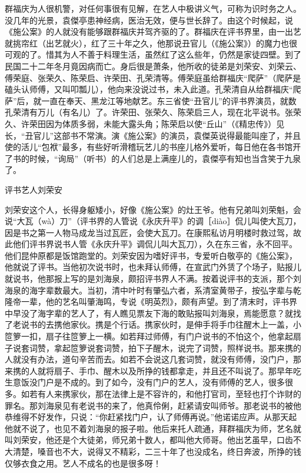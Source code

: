 \documentclass[12pt,UTF8]{ctexbook}
\begin{document}
群福庆为人很机警，对任何事很有见解，在艺人中极讲义气，可称为识时务之人。没几年的光景，袁傑亭患神经病，医治无效，便与世长辞了。由这个时候起，说《施公案》的人就没有能够跟群福庆并驾齐驱的了。群福庆在评书界里，由一出艺就挑帘红（出艺就火），红了三十年之久，他那说丑官儿（《施公案》）的魔力也很可观的了。惜其为人不善于料理生活，虽然红了这么些年，仍然是家徒四壁。到了民国二十二年冬月竟因病而亡。身后很是萧条，他所收的徒弟是刘荣安、刘荣云、傅荣庭、张荣久、陈荣启、许荣田、孔荣清等。傅荣庭虽给群福庆“爬萨”（爬萨是磕头认师傅，又叫叩瓢儿），他向来没说过书，未入此道。孔荣清自从给群福庆“爬萨”后，就一直在奉天、黑龙江等地献艺。东三省使“丑官儿”的评书界演员，就数孔荣清有万儿（有名儿）了。许荣田、张荣久、陈荣启三人，现在北平说书。张荣久、许荣田因为体质多弱，未能大露头角；陈荣启以使“丘山”（《精忠传》）见长，“丑官儿”这部书不常演。演《施公案》的演员，袁傑英说得最能叫座了，并且使的活儿“包袱”最多，有些好听滑稽玩艺儿的书座儿格外爱听，每日他在各书馆开了书的时候，“询局”（听书）的人们总是上满座儿的，袁傑亭有知也当含笑于九泉了。





评书艺人刘荣安


刘荣安这个人，长得身躯矮小，好像《施公案》的灶王爷。他有兄弟叫刘荣魁，会说“大瓦（wà）刀”（评书界的人管说《永庆升平》的调［diào］侃儿叫使大瓦刀，因是书之第一人物马成龙当过瓦匠，会使大瓦刀。在康熙私访月明楼时救过驾，故此他们评书界说书人管《永庆升平》调侃儿叫大瓦刀），久在东三省，永不回平。他们昆仲原都是饭馆跑堂的。刘荣安因为嗜好评书，专爱听白敬亭的《施公案》，他就说了评书。当他初次说书时，也未拜认师傅，在宣武门外赁了个场子，贴报儿就说书，他那报上写的是刘海泉，颇招评书界人不满。按着说评书的支派，那个刘海泉的海字辈数最大。当初，清中叶时有肇弘六者，系清室黄带子，按弘字辈与乾隆帝一辈，他的艺名叫肇海鸣，专说《明英烈》，颇有声望。到了清末时，评书界中早没了海字辈的艺人了，有人瞧见票友下海的敢贴报叫刘海泉，焉能愿意？就找了老说书的去携他家伙。携是个行话。携家伙时，是伸手将手巾往醒木上一盖，小笸箩一扣，扇子往笸箩上一横。如若拜过师傅，有门户说书的不怕这个，他拿起扇子说套词赞，拿起笸箩说套词赞，拍下子醒木，说完了词赞，照样说书。那来携的人就没有办法，道句辛苦而去。如若不会说这几套词赞，就没有师傅，没门户，那来携的人就将扇子、手巾、醒木以及所挣的钱都拿走，并且还不叫说了。那早年吃生意饭没门户是不成的。到了如今，没有门户的艺人，没有师傅的艺人，很多很多。如若有人来携家伙，那在法律上是不容许的，和他打官司，至轻也打个诈财的罪名。那刘海泉见有老说书的来了，他真伶俐，赶紧请安叫师爷。那老说书的被他恭维得不好发作，只说：“你赶紧找门户，认了师傅再说。”他诺诺应声。从那天起他就不说了，也见不着刘海泉的报子啦。他后来托人疏通，拜群福庆为师，艺名就叫刘荣安，他还是个大徒弟，师兄弟十数人，都叫他大师哥。他出艺虽早，口齿不大清楚，嗓音也不大，说得又不精彩，二三十年了也没成名，终日奔波，所挣的钱仅够衣食之用。艺人不成名的也是很多呀！
\end{document}
